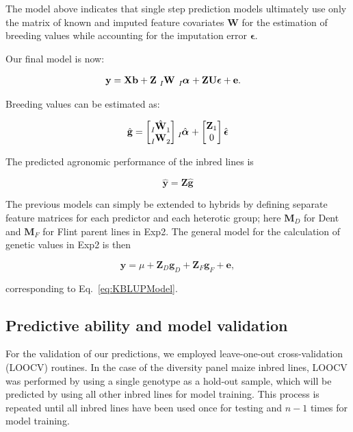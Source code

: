 \documentclass[12pt,titlepage]{article}
\begin{document}
The model above indicates that single step prediction models ultimately use
only the matrix of known and imputed feature covariates $\mathbf{W}$ for the
estimation of breeding values while accounting for the imputation error
$\boldsymbol{\epsilon}$.

Our final model is now:

\begin{align} \label{eq:final-model}
\mathbf{y} &= \mathbf{Xb} +
\mathbf{Z} \;
\tensor[_{I}]{\mathbf{W}}{} \;
\tensor[_{I}]{\boldsymbol{\alpha}}{} +
\mathbf{Z}\mathbf{U} \boldsymbol{\epsilon} +
\mathbf{e}.
\end{align}

Breeding values can be estimated as:

\begin{equation} \label{eq:breeding-values}
\hat{\mathbf{g}} =
 \begin{bmatrix}
  \tensor[_{I}]{\hat{\mathbf{W}}}{_{1}} \\
  \tensor[_{I}]{\mathbf{W}}{_{2}}
 \end{bmatrix}
 \tensor[_{I}]{\hat{\boldsymbol{\alpha}}}{}
 +
 \begin{bmatrix}
  \mathbf{Z}_1 \\
  0
 \end{bmatrix}
 \hat{\boldsymbol{\epsilon}}
\end{equation}


The predicted agronomic performance of the inbred lines is

\begin{equation} \label{eq:inbred-predicted-performance}
\hat{\mathbf{y}} = \mathbf{Z}\mathbf{\hat{g}} 
\end{equation}

The previous models can simply be extended to hybrids by defining separate
feature matrices for each predictor and each heterotic group; here
$\mathbf{M}_{D}$ for Dent and $\mathbf{M}_{F}$ for Flint parent lines in Exp2.
The general model for the calculation of genetic values in Exp2 is then

\begin{equation} \label{eq:hybrid-genetic-value-model}
  \mathbf{y} = \mu + \mathbf{Z}_{D} \mathbf{g}_{D} +
  \mathbf{Z}_{F} \mathbf{g}_{F} +
  \mathbf{e},
\end{equation}

corresponding to Eq.~\ref{eq:KBLUPModel}.


\subsection{Predictive ability and model validation}
For the validation of our predictions, we employed leave-one-out
cross-validation (LOOCV) routines.
In the case of the diversity panel maize inbred lines, LOOCV was performed by 
using a single genotype as a hold-out sample, which will be predicted by using
all other inbred lines for model training.
This process is repeated until all inbred lines have been used once for testing
and $n - 1$ times for model training.
\end{document}
